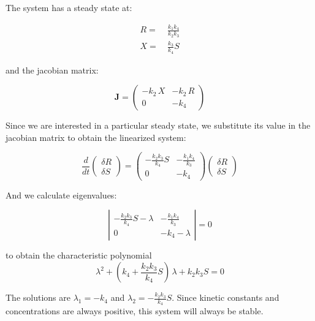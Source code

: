 \documentclass[12pt]{article}
\begin{document}
The system has a steady state at:

\begin{align}
	R =&\: \frac{k_1 k_4}{k_2 k_3}  \nonumber\\
	X =&\: \frac{k_3}{k_4}S \nonumber
\end{align}

and the jacobian matrix:

\begin{equation}
\mathbf{J} =	 \begin{pmatrix} - k_2 \, X &  - k_2 \, R \\   0  & -k_4 	\end{pmatrix} \nonumber
\end{equation}

Since we are interested in a particular steady state, we substitute its value in the jacobian matrix to obtain the linearized system:

\begin{equation}
\frac{d}{dt}	 \begin{pmatrix} \delta R \\ \delta S	\end{pmatrix} =	 \begin{pmatrix} - \frac{k_2 k_3}{k_4}S &  - \frac{k_1 k_4}{k_3} \\   0  & -k_4 	\end{pmatrix} \begin{pmatrix} \delta R \\ \delta S	\end{pmatrix} \nonumber
\end{equation}

And we calculate eigenvalues:

\begin{equation}
\left| \begin{matrix} - \frac{k_2 k_3}{k_4}S - \lambda &  - \frac{k_1 k_4}{k_3} \\   0  & -k_4-\lambda 	\end{matrix} \right|=0 \nonumber
\end{equation}

to obtain the characteristic polynomial
\begin{equation}
	\lambda^2 + \left( k_4 + \frac{k_2 k_3}{k_4}S \right) \, \lambda +k_2 k_3 S=0 \nonumber
\end{equation}

The solutions are $\lambda_1 = -k_4$ and $\lambda_2=-\frac{k_2 k_3}{k_4}S$. Since kinetic constants and concentrations are always positive, this system will always be stable.
\end{document}
